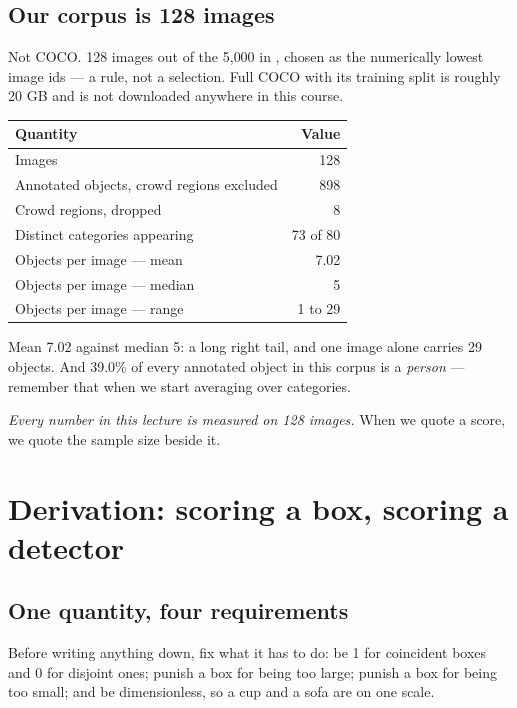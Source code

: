 \documentclass[11pt,a4paper]{article}
\begin{document}
\subsection{Our corpus is 128 images}

Not COCO. 128 images out of the 5{,}000 in , chosen as the
numerically lowest image ids --- a rule, not a selection. Full COCO with its
training split is roughly 20 GB and is not downloaded anywhere in this course.

\begin{center}
\small
\begin{tabular}{lr}
\toprule
\textbf{Quantity} & \textbf{Value} \\
\midrule
Images & 128 \\
Annotated objects, crowd regions excluded & 898 \\
Crowd regions, dropped & 8 \\
Distinct categories appearing & 73 of 80 \\
Objects per image --- mean & 7.02 \\
Objects per image --- median & 5 \\
Objects per image --- range & 1 to 29 \\
\bottomrule
\end{tabular}
\end{center}

Mean 7.02 against median 5: a long right tail, and one image alone carries 29
objects. And 39.0\% of every annotated object in this corpus is a
\emph{person} --- remember that when we start averaging over categories.

\emph{Every number in this lecture is measured on 128 images.} When we quote a
score, we quote the sample size beside it.

\section{Derivation: scoring a box, scoring a detector}

\subsection{One quantity, four requirements}

Before writing anything down, fix what it has to do: be 1 for coincident boxes
and 0 for disjoint ones; punish a box for being too large; punish a box for
being too small; and be dimensionless, so a cup and a sofa are on one scale.
\end{document}
